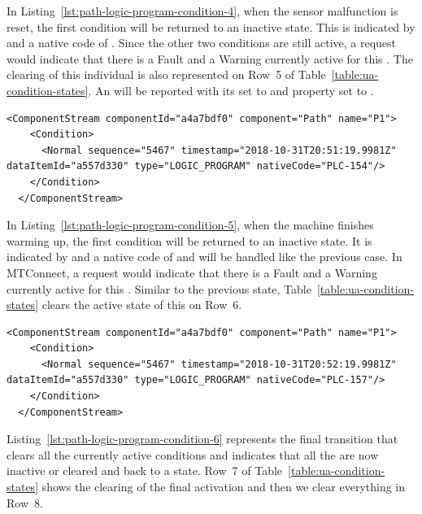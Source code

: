 In Listing~\ref{lst:path-logic-program-condition-4}, when the sensor malfunction is reset, the first condition will be returned to an inactive state. This is indicated by  and a native code of . Since the other two conditions are still active, a  request would indicate that there is a Fault and a Warning currently active for this . The clearing of this individual  is also represented on Row~5 of Table~\ref{table:ua-condition-states}. An   will be reported with its  set to  and  property set to .

\begin{lstlisting}[firstnumber=last,escapechar=|,%
    caption={Path Logic Program Clear Fault of PLC-154},label={lst:path-logic-program-condition-4}]
  <ComponentStream componentId="a4a7bdf0" component="Path" name="P1">
    <Condition>
      <Normal sequence="5467" timestamp="2018-10-31T20:51:19.9981Z" dataItemId="a557d330" type="LOGIC_PROGRAM" nativeCode="PLC-154"/>
    </Condition>
  </ComponentStream>
\end{lstlisting}

In Listing~\ref{lst:path-logic-program-condition-5}, when the machine finishes warming up, the first condition will be returned to an inactive state. It is indicated by  and a native code of  and will be handled like the previous case. In MTConnect, a  request would indicate that there is a Fault and a Warning currently active for this . Similar to the previous state, Table~\ref{table:ua-condition-states} clears the active state of this  on Row~6.

\begin{lstlisting}[firstnumber=last,escapechar=|,%
    caption={Path Logic Program Clear Warning PLC-157},label={lst:path-logic-program-condition-5}]
  <ComponentStream componentId="a4a7bdf0" component="Path" name="P1">
    <Condition>
      <Normal sequence="5467" timestamp="2018-10-31T20:52:19.9981Z" dataItemId="a557d330" type="LOGIC_PROGRAM" nativeCode="PLC-157"/>
    </Condition>
  </ComponentStream>
\end{lstlisting}

Listing~\ref{lst:path-logic-program-condition-6} represents the final  transition that clears all the currently active conditions and indicates that all the  are now inactive or cleared and back to a  state. Row~7 of Table~\ref{table:ua-condition-states} shows the clearing of the final activation and then we clear everything in Row~8.

